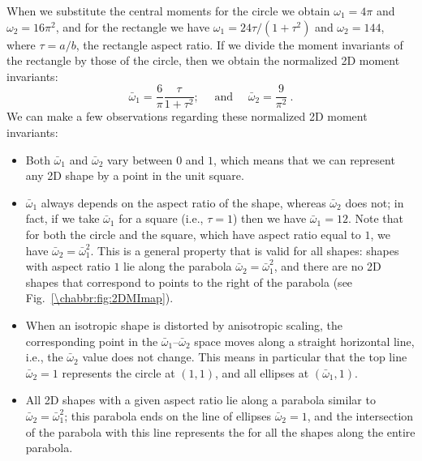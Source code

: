 When we substitute the central moments for the circle we obtain $\omega_1=4\pi$ and $\omega_2=16\pi^2$, and for the rectangle we have $\omega_1=24\tau/(1+\tau^2)$ and $\omega_2=144$, where $\tau=a/b$, the rectangle aspect ratio.  If we divide the moment invariants of the rectangle by those of the circle, then we obtain the normalized 2D moment invariants:
\begin{equation}
	\bar{\omega}_1=\frac{6}{\pi}\frac{\tau}{1+\tau^2};\quad\text{ and }\quad \bar{\omega}_2 = \frac{9}{\pi^2}\ .	
\end{equation}
We can make a few observations regarding these normalized 2D moment invariants:
\begin{itemize}
	\item Both $\bar{\omega}_1$ and $\bar{\omega}_2$ vary between $0$ and $1$, which means that we can represent any 2D shape by a point in the unit square.
	\item $\bar{\omega}_1$ always depends on the aspect ratio of the shape, whereas $\bar{\omega}_2$ does not; in fact, if we take $\bar{\omega}_1$ for a square (i.e., $\tau=1$) then we have $\bar{\omega}_1=12$. Note that for both the circle and the square, which have aspect ratio equal to $1$, we have $\bar{\omega}_2=\bar{\omega}^2_1$. This is a general property that is valid for all shapes: shapes with aspect ratio $1$ lie along the parabola $\bar{\omega}_2=\bar{\omega}^2_1$, and there are no 2D shapes that correspond to points to the right of the parabola (see Fig.~\ref{\chabbr:fig:2DMImap}).
	\item When an isotropic shape is distorted by anisotropic scaling, the corresponding point in the $\bar{\omega}_1$--$\bar{\omega}_2$ space moves along a straight horizontal line, i.e., the $\bar{\omega}_2$ value does not change.  This means in particular that the top line $\bar{\omega}_2=1$ represents the circle at $(1,1)$, and all ellipses at $(\bar{\omega}_1,1)$.
	\item All 2D shapes with a given aspect ratio lie along a parabola similar to $\bar{\omega}_2=\bar{\omega}^2_1$; this parabola ends on the line of ellipses $\bar{\omega}_2=1$, and the intersection of the parabola with this line represents the  for all the shapes along the entire parabola. 
\end{itemize}

